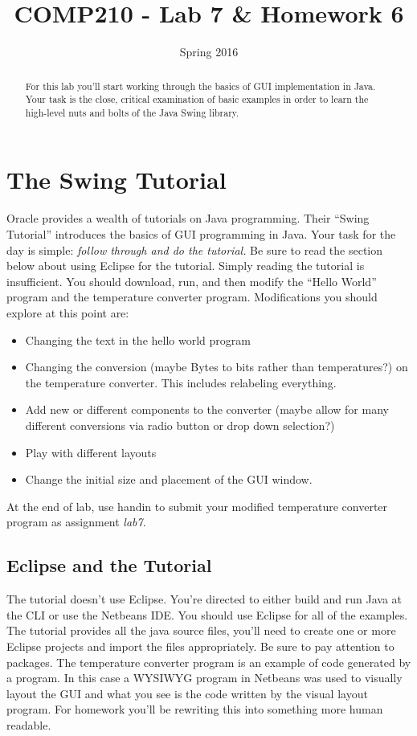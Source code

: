 \documentclass[]{tufte-handout}
\title{COMP210 - Lab 7 \& Homework 6}
\author{}
\date{Spring 2016}
\begin{document}
\maketitle

\begin{abstract}
For this lab you'll start working through the basics of GUI implementation in Java.  Your task is the close, critical examination of basic examples in order to learn the high-level nuts and bolts of the Java Swing library.
\end{abstract}

\section{The Swing Tutorial}

Oracle provides a wealth of tutorials on Java programming.  Their ``Swing Tutorial'' introduces the basics of GUI programming in Java.  Your task for the day is simple: \textit{follow through and do the tutorial.} Be sure to read the section below about using Eclipse for the tutorial. Simply reading the tutorial is insufficient.  You should download, run, and then modify the ``Hello World'' program and the temperature converter program. Modifications you should explore at this point are:
\begin{itemize}
\item Changing the text in the hello world program
\item Changing the conversion (maybe Bytes to bits rather than temperatures?) on the temperature converter. This includes relabeling everything.
\item Add new or different components to the converter (maybe allow for many different conversions via radio button or drop down selection?)
\item Play with different layouts
\item Change the initial size and placement of the GUI window. 
\end{itemize}
At the end of lab, use handin to submit your modified temperature converter program as assignment \textit{lab7}.

\subsection*{Eclipse and the Tutorial}

The tutorial doesn't use Eclipse. You're directed to either build and run Java at the CLI or use the Netbeans IDE. You should use Eclipse for all of the examples.  The tutorial provides all the java source files, you'll need to create one or more Eclipse projects and import the files appropriately. Be sure to pay attention to packages. The temperature converter program is an example of code generated by a program. In this case a WYSIWYG program in Netbeans was used to visually layout the GUI and what you see is the code written by the visual layout program. For homework you'll be rewriting this into something more human readable. 
\end{document}
